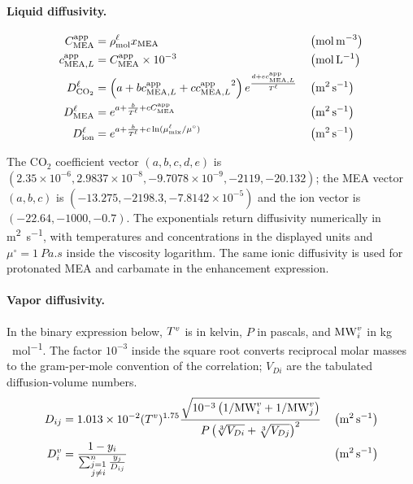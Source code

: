 \paragraph{Liquid diffusivity.}
\begin{align}
C_{\MEA}^{\mathrm{app}} &= \rho_{\mathrm{mol}}^{\liq}x_{\MEA} && \left(\unit{mol\,m^{-3}}\right)\\
c_{\MEA,L}^{\mathrm{app}} &= C_{\MEA}^{\mathrm{app}}\times10^{-3}
&& \left(\unit{mol\,L^{-1}}\right)\\
D^{\liq}_{ \COtwo} &= \left(a + b c_{\MEA,L}^{\mathrm{app}} + c {c_{\MEA,L}^{\mathrm{app}}}^2\right) e^{\frac{d + e c_{\MEA,L}^{\mathrm{app}}}{T^{\liq}}}
&& \left(\unit{m^{2}\,s^{-1}}\right)\\
D^{\liq}_{ \MEA} &= e^{a + \frac{b}{T^{\liq}} + c C_{\MEA}^{\mathrm{app}}}
&& \left(\unit{m^{2}\,s^{-1}}\right)\\
D^{\liq}_{ \text{ion}} &= e^{a + \frac{b}{T^{\liq}} + c \ln(\mu ^{\liq}_{ \text{mix}}/\mu^\circ)}
&& \left(\unit{m^{2}\,s^{-1}}\right)
\end{align}
\vspace{.5cm}

The CO$_2$ coefficient vector $(a,b,c,d,e)$ is $(2.35\times10^{-6},2.9837\times10^{-8},-9.7078\times10^{-9},-2119,-20.132)$; the MEA vector $(a,b,c)$ is $(-13.275,-2198.3,-7.8142\times10^{-5})$ and the ion vector is $(-22.64,-1000,-0.7)$.
The exponentials return diffusivity numerically in \unit{m^2.s^{-1}}, with temperatures and concentrations in the displayed units and $\mu^\circ=\qty{1}{Pa.s}$ inside the viscosity logarithm.
The same ionic diffusivity is used for protonated MEA and carbamate in the enhancement expression.

\paragraph{Vapor diffusivity.}
In the binary expression below, $T^{v}$ is in kelvin, $P$ in pascals, and $\text{MW}_i^{v}$ in \unit{kg\,mol^{-1}}.
The factor $10^{-3}$ inside the square root converts reciprocal molar masses to the gram-per-mole convention of the correlation; $V_{Di}$ are the tabulated diffusion-volume numbers.
\begin{align}
D_{i j} &= 1.013 \times 10^{-2} (T^{\vap})^{1.75} \frac{\sqrt{10^{-3}\left(1/\text{MW}^{\vap}_{i}+1/\text{MW}^{\vap}_{j}\right)}}{P\left(\sqrt[3]{V_{D i}}+\sqrt[3]{V_{D j}}\right)^2}
&& \left(\unit{m^{2}\,s^{-1}}\right)\\
D^{\vap}_{ i} &= \frac{1-y_i}{\sum_{\substack{j=1 \\ j \neq i}}^n \frac{y_j}{D_{i j}}}
&& \left(\unit{m^{2}\,s^{-1}}\right)
\end{align}



